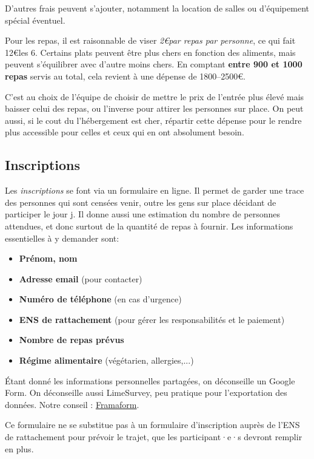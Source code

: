 D'autres frais peuvent s'ajouter, notamment la location de salles
ou d'équipement spécial éventuel.

Pour les repas, il est raisonnable de viser \emph{2\euro par repas par personne}, ce qui fait 12\euro les 6. Certains plats peuvent être plus chers en fonction des aliments, mais peuvent s'équilibrer avec d'autre moins chers. En comptant \textbf{entre 900 et 1000 repas} servis au total, cela revient à une dépense de 1800--2500\euro.

C'est au choix de l'équipe de choisir de mettre le prix de l'entrée plus élevé mais baisser celui des repas, ou l'inverse pour attirer les personnes sur place. On peut aussi, si le cout du l'hébergement est cher, répartir cette dépense pour le rendre plus accessible pour celles et ceux qui en ont absolument besoin.

\subsection{Inscriptions}

Les \emph{inscriptions} se font via un formulaire en ligne. Il permet de garder une trace des personnes qui sont censées venir, outre les gens sur place décidant de participer le jour j. Il donne aussi une estimation du nombre de personnes attendues, et donc surtout de la quantité de repas à fournir. Les informations essentielles à y demander sont:

\begin{itemize}
    \item \textbf{Prénom, nom}
    \item \textbf{Adresse email} (pour contacter)
    \item \textbf{Numéro de téléphone} (en cas d'urgence)
    \item \textbf{ENS de rattachement} (pour gérer les responsabilités et le paiement)
    \item \textbf{Nombre de repas prévus}
    \item \textbf{Régime alimentaire} (végétarien, allergies,...)
\end{itemize}

Étant donné les informations personnelles partagées, on déconseille un Google Form. On déconseille aussi LimeSurvey, peu pratique pour l'exportation des données. Notre conseil : \href{https://framaforms.org}{Framaform}.

\begin{Attention}{}{}
Ce formulaire ne se substitue pas à un formulaire d'inscription auprès de l'ENS de rattachement pour prévoir le trajet, que les participant·e·s devront remplir en plus.
\end{Attention}


